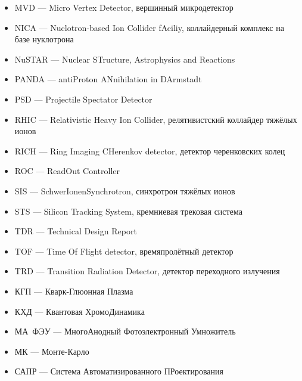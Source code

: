 \begin{itemize}
\item [] MVD --- Micro Vertex Detector, вершинный микродетектор
\item [] NICA --- Nuclotron-based Ion Collider fAciliy, коллайдерный комплекс на базе нуклотрона
\item [] NuSTAR --- Nuclear STructure, Astrophysics and Reactions
\item [] PANDA --- antiProton ANnihilation in DArmstadt
\item [] PSD --- Projectile Spectator Detector
\item [] RHIC --- Relativistic Heavy Ion Collider, релятивистский коллайдер тяжёлых ионов
\item [] RICH --- Ring Imaging CHerenkov detector, детектор черенковских колец
\item [] ROC --- ReadOut Controller
\item [] SIS --- SchwerIonenSynchrotron, синхротрон тяжёлых ионов
\item [] STS --- Silicon Tracking System, кремниевая трековая система
\item [] TDR --- Technical Design Report
\item [] TOF --- Time Of Flight detector, времяпролётный детектор
\item [] TRD --- Transition Radiation Detector, детектор переходного излучения
\item [] КГП --- Кварк-Глюонная Плазма
\item [] КХД --- Квантовая ХромоДинамика
\item [] МА~ФЭУ --- МногоАнодный Фотоэлектронный Умножитель
\item [] МК --- Монте-Карло
\item [] САПР --- Система Автоматизированного ПРоектирования
\end{itemize}
